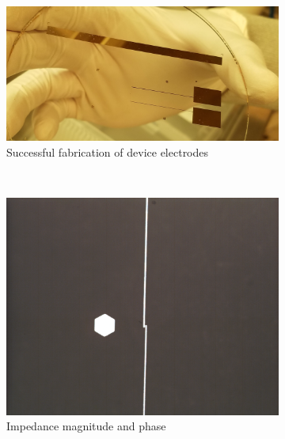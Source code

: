 \begin{figure}[h]
    \begin{subfigure}[b]{\textwidth}
        \centering
        \includegraphics[width=\textwidth]{images/electrodes_real.jpg}
        \caption{Successful fabrication of device electrodes}
    \end{subfigure}
    \\
    \vspace{0.1 in}
    \centering
    \begin{subfigure}[b]{0.45\textwidth}
        \centering
        \includegraphics[width=\textwidth]{images/goodElectrode.png}
        \caption{Impedance magnitude and phase}
    \end{subfigure}
    \hfill
    \begin{subfigure}[b]{0.45\textwidth}
        \centering

\end{subfigure}
\end{figure}
